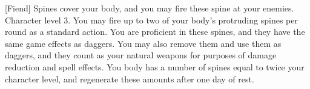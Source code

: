  {[Fiend]}
\shortdescfeat
{Spines cover your body, and you may fire these spine at your enemies.}
{Character level 3.}
{You may fire up to two of your body's protruding spines per round as a standard action. You are proficient in these spines, and they have the same game effects as daggers. You may also remove them and use them as daggers, and they count as your natural weapons for purposes of damage reduction and spell effects. You body has a number of spines equal to twice your character level, and regenerate these amounts after one day of rest.}
